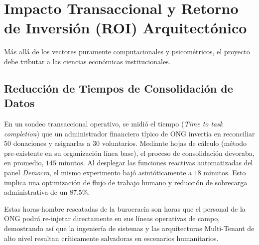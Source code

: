 \section{Impacto Transaccional y Retorno de Inversi\'on (ROI) Arquitect\'onico}

M\'as all\'a de los vectores puramente computacionales y psicom\'etricos, el proyecto debe tributar a las ciencias econ\'omicas institucionales.

\subsection{Reducci\'on de Tiempos de Consolidaci\'on de Datos}
En un sondeo transaccional operativo, se midi\'o el tiempo (\textit{Time to task completion}) que un administrador financiero t\'ipico de ONG invert\'ia en reconciliar 50 donaciones y asignarlas a 30 voluntarios. Mediante hojas de c\'alculo (m\'etodo pre-existente en su organizaci\'on l\'inea base), el proceso de consolidaci\'on devoraba, en promedio, $145 \text{ minutos}$.
Al desplegar las funciones reactivas automatizadas del panel \textit{Democra}, el mismo experimento baj\'o asint\'oticamente a $18 \text{ minutos}$. Esto implica una optimizaci\'on de flujo de trabajo humano y reducci\'on de sobrecarga administrativa de un 87.5\%.

Estas horas-hombre rescatadas de la burocracia son horas que el personal de la ONG podr\'a re-injetar directamente en sus l\'ineas operativas de campo, demostrando as\'i que la ingenier\'ia de sistemas y las arquitecturas Multi-Tenant de alto nivel resultan cr\'iticamente salvadoras en escenarios humanitarios.
